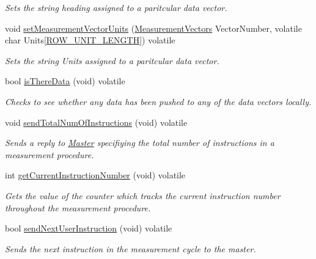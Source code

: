 \begin{DoxyCompactItemize}
\begin{DoxyCompactList}\small\item\em Sets the string heading assigned to a paritcular data vector. \end{DoxyCompactList}\item 
void \mbox{\hyperlink{class_master_a5f955da291f31441d726c4ded74c32bd}{set\+Measurement\+Vector\+Units}} (\mbox{\hyperlink{_s_p_i___instruction_set_8h_a9d8048399836e11887f85cc8dc3d75d5}{Measurement\+Vectors}} Vector\+Number, volatile char Units\mbox{[}\mbox{\hyperlink{_s_p_i___instruction_set_8h_af45194e4246701e52a2d67f27cc3ffb8}{R\+O\+W\+\_\+\+U\+N\+I\+T\+\_\+\+L\+E\+N\+G\+TH}}\mbox{]}) volatile
\begin{DoxyCompactList}\small\item\em Sets the string Units assigned to a paritcular data vector. \end{DoxyCompactList}\item 
bool \mbox{\hyperlink{class_master_a23536349ac40fc9cc030e9bc5d0c5945}{is\+There\+Data}} (void) volatile
\begin{DoxyCompactList}\small\item\em Checks to see whether any data has been pushed to any of the data vectors locally. \end{DoxyCompactList}\item 
void \mbox{\hyperlink{class_master_aa68bb1327d506c42b6b7ab54fd73ca62}{send\+Total\+Num\+Of\+Instructions}} (void) volatile
\begin{DoxyCompactList}\small\item\em Sends a reply to \mbox{\hyperlink{class_master}{Master}} specifiying the total number of instructions in a measurement procedure. \end{DoxyCompactList}\item 
int \mbox{\hyperlink{class_master_a250b4f7cdb96abb0be9ffdc54d00be31}{get\+Current\+Instruction\+Number}} (void) volatile
\begin{DoxyCompactList}\small\item\em Gets the value of the counter which tracks the current instruction number throughout the measurement procedure. \end{DoxyCompactList}\item 
bool \mbox{\hyperlink{class_master_a6445732d38d6bac09ab8c8bd66bd4e2a}{send\+Next\+User\+Instruction}} (void) volatile
\begin{DoxyCompactList}\small\item\em Sends the next instruction in the measurement cycle to the master. \end{DoxyCompactList}\item 

\end{DoxyCompactItemize}
